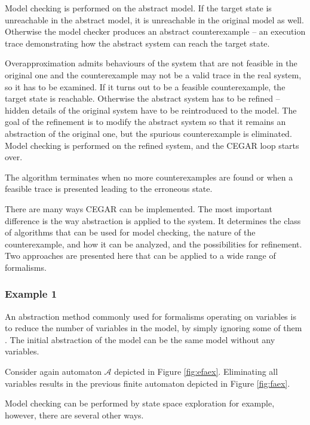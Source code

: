 Model checking is performed on the abstract model. If the target state is
unreachable in the abstract model, it is unreachable in the original model
as well. Otherwise the model checker produces an abstract counterexample -- an execution trace demonstrating how the abstract
system can reach the target state. 

Overapproximation admits behaviours of the system that are not feasible in the original one and the counterexample may not be a valid trace in the real system, so it has to be examined.
If it turns out to be a feasible counterexample, the target state is reachable. Otherwise
the abstract system has to be refined -- hidden details of the original system have to be reintroduced to the model. The goal of the refinement is to modify the abstract
system so that it remains an abstraction of the original one, but the spurious
counterexample is eliminated.  Model checking is performed on the
refined system, and the CEGAR loop starts over. 

The algorithm terminates when no more
counterexamples are found or when a feasible trace is
presented leading to the erroneous state.

There are many ways CEGAR can be implemented. The most important difference is the way abstraction is applied to the system. It determines the class of algorithms that can be used for model checking, the nature of the counterexample, and how it can be analyzed, and the possibilities for refinement. Two approaches are presented here that can be applied to a wide range of formalisms.

\subsubsection{Example 1} \label{sec:cegarex1}

An abstraction method commonly used for formalisms operating on variables is to reduce the number of variables in the model, by simply ignoring some of them \cite{Clarke:1994:MCA}. The initial abstraction of the model can be the same model without any variables.
 
 \begin{example}
 	Consider again automaton $\mathcal{A}$ depicted in Figure \ref{fig:efaex}. Eliminating all variables results in the previous finite automaton depicted in Figure \ref{fig:faex}.
 \end{example}

Model checking can be performed by state space exploration for example, however, there are several other ways.

